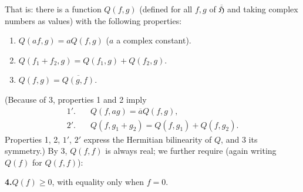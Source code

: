 \documentclass[fontsize=13pt,paper=b5,twoside,bookmarkpackage=false]{scrartcl}
\begin{document}
That is: there is a function $Q(f,g)$ (defined for all $f,g$ of $\overline{\mathfrak{H}}$ and taking complex numbers as values) with the following properties:
\begin{enumerate}
\item $Q(af,g)=aQ(f,g)$ ($a$ a complex constant).
\item $Q(f_1+f_2,g)=Q(f_1,g)+Q(f_2,g)$.
\item $Q(f,g)=\overline{Q(g,f)}$.
\end{enumerate}
(Because of 3, properties 1 and 2 imply
\begin{align*}
1'.\quad &Q(f,ag)=\overline{a}Q(f,g),\\
2'.\quad &Q(f,g_1+g_2)=Q(f,g_1)+Q(f,g_2).
\end{align*}
Properties 1, 2, $1'$, $2'$ express the Hermitian bilinearity of $Q$, and 3 its symmetry.) By 3, $Q(f,f)$ is always real; we further require (again writing $Q(f)$ for $Q(f,f)$):

\noindent\textbf{4.}\quad $Q(f)\ge0$, with equality only when $f=0$.
\end{document}
